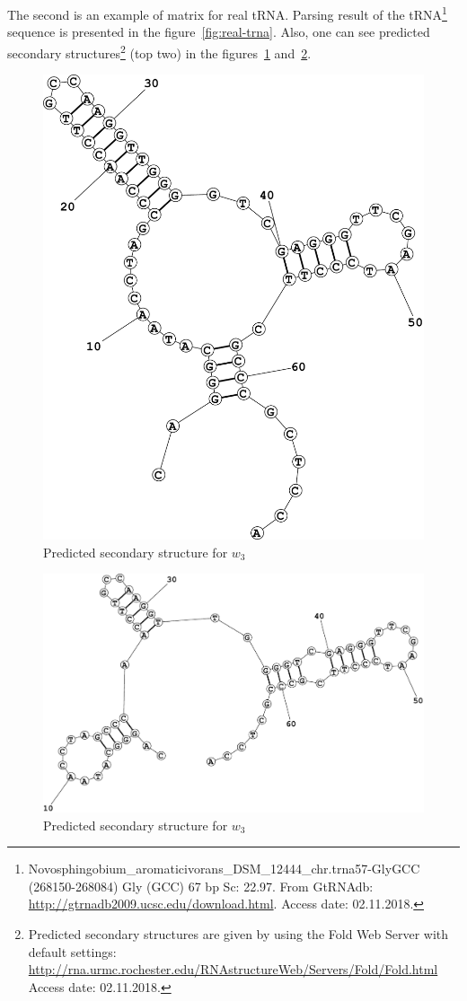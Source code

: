 \documentclass[a4paper,twoside]{article}
\begin{document}
The second is an example of matrix for real tRNA.
Parsing result of the tRNA\footnote{Novosphingobium\_aromaticivorans\_DSM\_12444\_chr.trna57-GlyGCC (268150-268084)  Gly (GCC) 67 bp Sc: 22.97. From GtRNAdb: \url{http://gtrnadb2009.ucsc.edu/download.html}. Access date: 02.11.2018.} sequence {} is presented in the figure~\ref{fig:real-trna}. Also, one can see predicted secondary structures\footnote{Predicted secondary structures are given by using the Fold Web Server with default settings: \url{http://rna.urmc.rochester.edu/RNAstructureWeb/Servers/Fold/Fold.html} Access date: 02.11.2018.} (top two) in the figures~\ref{fig:real-trna-folding1} and~\ref{fig:real-trna-folding2}.

\begin{figure}
\centering
\includegraphics[width=.45\textwidth]{figures/Fold1.pdf}
\caption{Predicted secondary structure for $w_3$}
\label{fig:real-trna-folding1}
\end{figure}


\begin{figure}
\centering
\includegraphics[width=.45\textwidth]{figures/Fold2.pdf}
\caption{Predicted secondary structure for $w_3$}
\label{fig:real-trna-folding2}
\end{figure}
\end{document}
